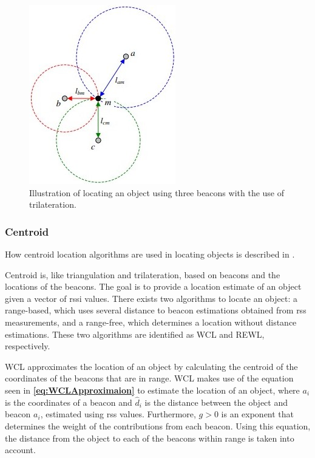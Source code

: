 \begin{figure}[H]
    \centering
    \includegraphics[scale=0.8]{Images/ProblemAnalysis/trilateration.jpg}
    \caption{Illustration of locating an object using three beacons with the use of trilateration\cite{Triangulation}.}
    \label{fig:trilateration}
\end{figure}

\subsubsection{Centroid}
How centroid location algorithms are used in locating objects is described in \cite{5759777}.

Centroid is, like triangulation and trilateration, based on beacons and the locations of the beacons. The goal is to provide a location estimate of an object given a vector of \gls{rssi} values. There exists two algorithms to locate an object: a range-based, which uses several distance to beacon estimations obtained from \gls{rss} measurements, and a range-free, which determines a location without distance estimations. These two algorithms are identified as WCL and REWL, respectively.

WCL approximates the location of an object by calculating the centroid of the coordinates of the beacons that are in range. WCL makes use of the equation seen in \textbf{\autoref{eq:WCLApproximaion}} to estimate the location of an object, where $a_i$ is the coordinates of a beacon and $\hat{d}_i$ is the distance between the object and beacon $a_i$, estimated using \gls{rss} values. Furthermore, $g > 0$ is an exponent that determines the weight of the contributions from each beacon. Using this equation, the distance from the object to each of the beacons within range is taken into account.

